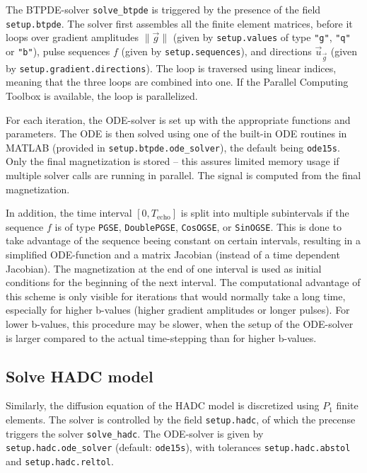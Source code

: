 \documentclass[a4paper]{article}
\begin{document}
The BTPDE-solver \verb+solve_btpde+ is triggered by the presence of the field \verb+setup.btpde+. The solver first assembles all the finite element matrices, before it loops over gradient amplitudes $\|\vec{g}\|$ (given by \verb+setup.values+ of type \verb+"g"+, \verb+"q"+ or \verb+"b"+), pulse sequences $f$ (given by \verb+setup.sequences+), and directions $\vec{u}_{\vec{g}}$ (given by \verb+setup.gradient.directions+). The loop is traversed using linear indices, meaning that the three loops are combined into one. If the Parallel Computing Toolbox is available, the loop is parallelized.

For each iteration, the ODE-solver is set up with the appropriate functions and parameters. The ODE is then solved using one of the built-in ODE routines in MATLAB (provided in \verb+setup.btpde.ode_solver+), the default being \verb+ode15s+. Only the final magnetization is stored -- this assures limited memory usage if multiple solver calls are running in parallel. The signal is computed from the final magnetization.

In addition, the time interval $[0, T_\text{echo}]$ is split into multiple subintervals if the sequence $f$ is of type \verb+PGSE+, \verb+DoublePGSE+, \verb+CosOGSE+, or \verb+SinOGSE+. This is done to take advantage of the sequence beeing constant on certain intervals, resulting in a simplified ODE-function and a matrix Jacobian (instead of a time dependent Jacobian). The magnetization at the end of one interval is used as initial conditions for the beginning of the next interval. The computational advantage of this scheme is only visible for iterations that would normally take a long time, especially for higher b-values (higher gradient amplitudes or longer pulses). For lower b-values, this procedure may be slower, when the setup of the ODE-solver is larger compared to the actual time-stepping than for higher b-values.



\subsection{Solve HADC model} \label{sec:solve_hadc}

Similarly, the diffusion equation of the HADC model is discretized using $P_1$ finite elements. The solver is controlled by the field \verb+setup.hadc+, of which the precense triggers the solver \verb+solve_hadc+. The ODE-solver is given by \verb+setup.hadc.ode_solver+ (default: \verb+ode15s+), with tolerances \verb+setup.hadc.abstol+ and \verb+setup.hadc.reltol+.
\end{document}
